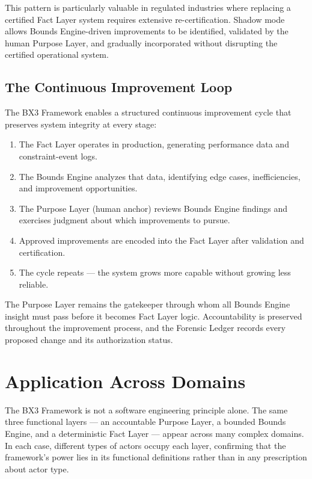 \documentclass[12pt]{article}
\begin{document}
This pattern is particularly valuable in regulated industries where replacing a certified Fact Layer system requires extensive re-certification. Shadow mode allows Bounds Engine-driven improvements to be identified, validated by the human Purpose Layer, and gradually incorporated without disrupting the certified operational system.

\subsection{The Continuous Improvement Loop}

The BX3 Framework enables a structured continuous improvement cycle that preserves system integrity at every stage:

\begin{enumerate}[noitemsep]
    \item The Fact Layer operates in production, generating performance data and constraint-event logs.
    \item The Bounds Engine analyzes that data, identifying edge cases, inefficiencies, and improvement opportunities.
    \item The Purpose Layer (human anchor) reviews Bounds Engine findings and exercises judgment about which improvements to pursue.
    \item Approved improvements are encoded into the Fact Layer after validation and certification.
    \item The cycle repeats --- the system grows more capable without growing less reliable.
\end{enumerate}

The Purpose Layer remains the gatekeeper through whom all Bounds Engine insight must pass before it becomes Fact Layer logic. Accountability is preserved throughout the improvement process, and the Forensic Ledger records every proposed change and its authorization status.

\section{Application Across Domains}
\label{sec:domains}

The BX3 Framework is not a software engineering principle alone. The same three functional layers --- an accountable Purpose Layer, a bounded Bounds Engine, and a deterministic Fact Layer --- appear across many complex domains. In each case, different types of actors occupy each layer, confirming that the framework's power lies in its functional definitions rather than in any prescription about actor type.
\end{document}
